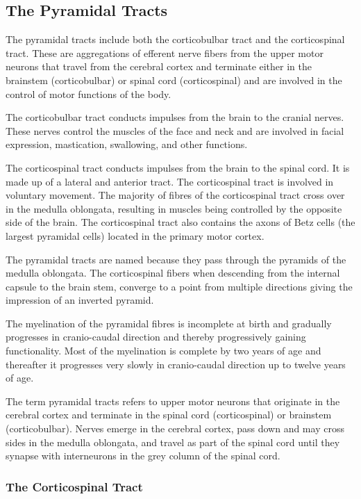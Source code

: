 \documentclass[]{book}
\begin{document}
\hypertarget{the-pyramidal-tracts}{%
\subsection{The Pyramidal Tracts}\label{the-pyramidal-tracts}}

The pyramidal tracts include both the corticobulbar tract and the corticospinal tract. These are aggregations of efferent nerve fibers from the upper motor neurons that travel from the cerebral cortex and terminate either in the brainstem (corticobulbar) or spinal cord (corticospinal) and are involved in the control of motor functions of the body.

The corticobulbar tract conducts impulses from the brain to the cranial nerves. These nerves control the muscles of the face and neck and are involved in facial expression, mastication, swallowing, and other functions.

The corticospinal tract conducts impulses from the brain to the spinal cord. It is made up of a lateral and anterior tract. The corticospinal tract is involved in voluntary movement. The majority of fibres of the corticospinal tract cross over in the medulla oblongata, resulting in muscles being controlled by the opposite side of the brain. The corticospinal tract also contains the axons of Betz cells (the largest pyramidal cells) located in the primary motor cortex.

The pyramidal tracts are named because they pass through the pyramids of the medulla oblongata. The corticospinal fibers when descending from the internal capsule to the brain stem, converge to a point from multiple directions giving the impression of an inverted pyramid.

The myelination of the pyramidal fibres is incomplete at birth and gradually progresses in cranio-caudal direction and thereby progressively gaining functionality. Most of the myelination is complete by two years of age and thereafter it progresses very slowly in cranio-caudal direction up to twelve years of age.

The term pyramidal tracts refers to upper motor neurons that originate in the cerebral cortex and terminate in the spinal cord (corticospinal) or brainstem (corticobulbar). Nerves emerge in the cerebral cortex, pass down and may cross sides in the medulla oblongata, and travel as part of the spinal cord until they synapse with interneurons in the grey column of the spinal cord.

\hypertarget{the-corticospinal-tract}{%
\subsubsection{The Corticospinal Tract}\label{the-corticospinal-tract}}
\end{document}
